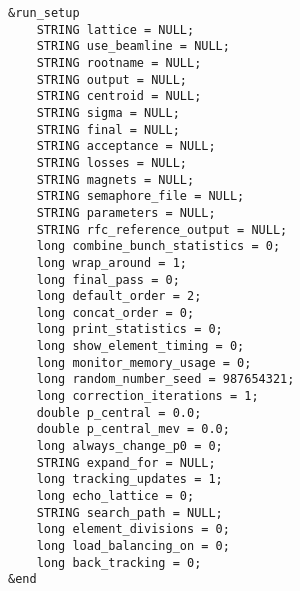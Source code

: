 \documentclass[11pt]{article}
\begin{document}
\begin{verbatim}
&run_setup
    STRING lattice = NULL;
    STRING use_beamline = NULL;
    STRING rootname = NULL;
    STRING output = NULL;
    STRING centroid = NULL;
    STRING sigma = NULL;
    STRING final = NULL;
    STRING acceptance = NULL;
    STRING losses = NULL;
    STRING magnets = NULL;
    STRING semaphore_file = NULL;
    STRING parameters = NULL;
    STRING rfc_reference_output = NULL;
    long combine_bunch_statistics = 0;
    long wrap_around = 1;
    long final_pass = 0;
    long default_order = 2;
    long concat_order = 0;
    long print_statistics = 0;
    long show_element_timing = 0;
    long monitor_memory_usage = 0;
    long random_number_seed = 987654321;
    long correction_iterations = 1;
    double p_central = 0.0;
    double p_central_mev = 0.0;
    long always_change_p0 = 0;
    STRING expand_for = NULL; 
    long tracking_updates = 1;
    long echo_lattice = 0;
    STRING search_path = NULL;
    long element_divisions = 0;
    long load_balancing_on = 0;
    long back_tracking = 0;
&end
\end{verbatim}
\end{document}
